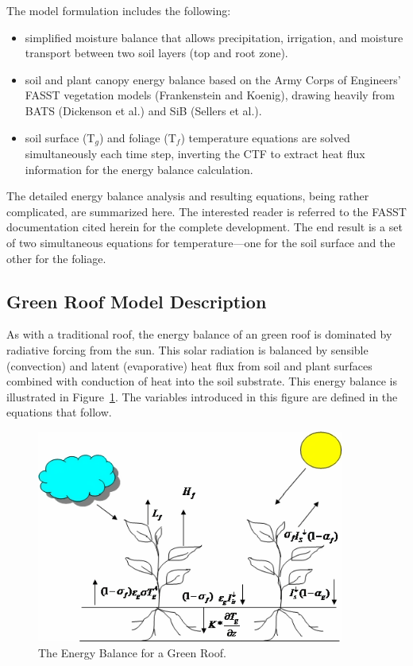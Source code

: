 The model formulation includes the following:

\begin{itemize}
\item
  simplified moisture balance that allows precipitation, irrigation, and moisture transport between two soil layers (top and root zone).
\item
  soil and plant canopy energy balance based on the Army Corps of Engineers' FASST vegetation models (Frankenstein and Koenig), drawing heavily from BATS (Dickenson et al.) and SiB (Sellers et al.).
\item
  soil surface (T\(_{g}\)) and foliage (T\(_{f}\)) temperature equations are solved simultaneously each time step, inverting the CTF to extract heat flux information for the energy balance calculation.
\end{itemize}

The detailed energy balance analysis and resulting equations, being rather complicated, are summarized here. The interested reader is referred to the FASST documentation cited herein for the complete development. The end result is a set of two simultaneous equations for temperature---one for the soil surface and the other for the foliage.

\subsection{Green Roof Model Description}\label{green-roof-model-description}

As with a traditional roof, the energy balance of an green roof is dominated by radiative forcing from the sun. This solar radiation is balanced by sensible (convection) and latent (evaporative) heat flux from soil and plant surfaces combined with conduction of heat into the soil substrate. This energy balance is illustrated in Figure~\ref{fig:the-energy-balance-for-a-green-roof.}. The variables introduced in this figure are defined in the equations that follow.

\begin{figure}[hbtp] %
\centering
\includegraphics[width=0.9\textwidth, height=0.9\textheight, keepaspectratio=true]{media/image509.png}
\caption{The Energy Balance for a Green Roof. \protect \label{fig:the-energy-balance-for-a-green-roof.}}
\end{figure}

